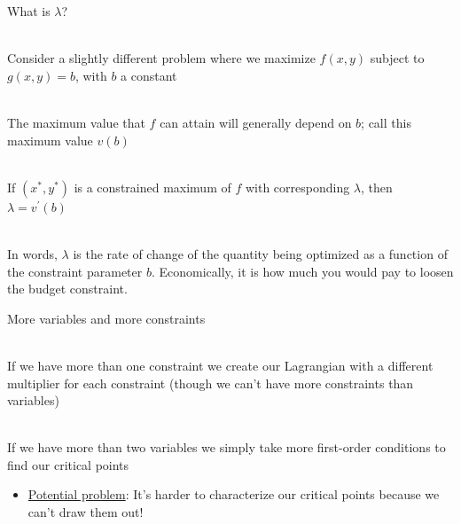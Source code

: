 \documentclass{beamer}
\numberwithin{equation}{section}
\begin{document}
\begin{frame}{What is $\lambda$?}


\ \\Consider a slightly different problem where we maximize $f(x, y)$ subject to $g(x, y)=b$, with $b$ a constant

\ \\The maximum value that $f$ can attain will generally depend on $b$; call this maximum value $v(b)$

\ \\If $(x^*, y^*)$ is a constrained maximum of $f$  with corresponding $\lambda$, then $\lambda=v^\prime(b)$

\ \\In words, $\lambda$ is the rate of change of the quantity being optimized as a function of the constraint parameter $b$.  Economically, it is how much you would pay to loosen the budget constraint.
\end{frame}

\begin{frame}{More variables and more constraints}

\ \\If we have more than one constraint we create our Lagrangian with a different multiplier for each constraint (though we can't have more constraints than variables)

\ \\If we have more than two variables we simply take more first-order conditions to find our critical points

\begin{itemize}
\item \underline{Potential problem}: It's harder to characterize our critical points because we can't draw them out! 
\end{itemize}

\end{frame}
\end{document}
